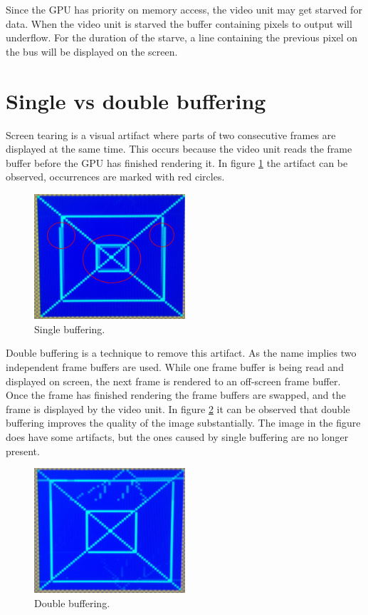 \documentclass[../main/report.tex]{subfiles}
\begin{document}
Since the GPU has priority on memory access, the video unit may get starved for data.
When the video unit is starved the buffer containing pixels to output will underflow.
For the duration of the starve, a line containing the previous pixel on the bus will be displayed on the screen.

\section{Single vs double buffering}

Screen tearing is a visual artifact where parts of two consecutive frames are displayed at the same time.
This occurs because the video unit reads the frame buffer before the GPU has finished rendering it.  
In figure \ref{fig:single_buffering} the artifact can be observed, occurrences are marked with red circles.

\begin{figure}[H]
	\centering
	\includegraphics[width=0.5\textwidth]{../results/diagrams/single_buffering.png}
	\caption{Single buffering.}
	\label{fig:single_buffering}
\end{figure}
Double buffering is a technique to remove this artifact.
As the name implies two independent frame buffers are used.
While one frame buffer is being read and displayed on screen, 
the next frame is rendered to an off-screen frame buffer.
Once the frame has finished rendering the frame buffers are swapped, and the frame is displayed by the video unit.
In figure \ref{fig:double_buffering} it can be observed that double buffering improves the quality of the image substantially.
The image in the figure does have some artifacts, but the ones caused by single buffering are no longer present.
\begin{figure}[H]
	\centering
	\includegraphics[width=0.5\textwidth]{../results/diagrams/double_buffering.png}
	\caption{Double buffering.}
	\label{fig:double_buffering}
\end{figure}
\end{document}
